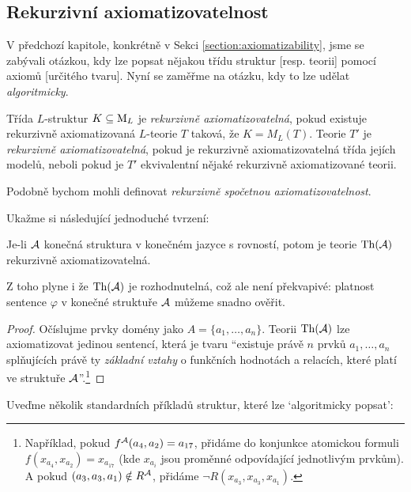  
\subsection{Rekurzivní axiomatizovatelnost}

V předchozí kapitole, konkrétně v Sekci \ref{section:axiomatizability}, jsme se zabývali otázkou, kdy lze popsat nějakou třídu struktur [resp. teorii] pomocí axiomů [určitého tvaru]. Nyní se zaměřme na otázku, kdy to lze udělat \emph{algoritmicky}.

\begin{definition}
Třída $L$-struktur $K\subseteq\operatorname{M}_L$ je \emph{rekurzivně axiomatizovatelná}, pokud existuje rekurzivně axiomatizovaná $L$-teorie $T$ taková, že $K=M_L(T)$. Teorie $T'$ je \emph{rekurzivně axiomatizovatelná}, pokud je rekurzivně axiomatizovatelná třída jejích modelů, neboli pokud je $T'$ ekvivalentní nějaké rekurzivně axiomatizované teorii.
\end{definition}
\begin{remark}
    Podobně bychom mohli definovat \emph{rekurzivně spočetnou axiomatizovatelnost}.
\end{remark}

Ukažme si následující jednoduché tvrzení:

\begin{proposition}
    Je-li $\mathcal{A}$ konečná struktura v konečném jazyce s rovností, potom je teorie $\operatorname{Th}(\mathcal{A})$ rekurzivně axiomatizovatelná.
\end{proposition}
\begin{remark}
    Z toho plyne i že $\operatorname{Th}(\mathcal{A})$ je rozhodnutelná, což ale není překvapivé: platnost sentence $\varphi$ v konečné struktuře $\mathcal{A}$ můžeme snadno ověřit.
\end{remark}
\begin{proof}
    Očíslujme prvky domény jako $A=\{a_1,\dots,a_n\}$. Teorii $\operatorname{Th}(\mathcal{A})$ lze axiomatizovat jedinou sentencí, která je tvaru ``existuje právě $n$ prvků $a_1,\dots,a_n$ splňujících právě ty \emph{základní vztahy} o funkčních hodnotách a relacích, které platí ve struktuře $\mathcal{A}$''.\footnote{Například, pokud $f^{\mathcal{A}}(a_4, a_2)=a_{17}$, přidáme do konjunkce atomickou formuli $f(x_{a_4},x_{a_2})=x_{a_{17}}$ (kde $x_{a_i}$ jsou proměnné odpovídající jednotlivým prvkům). A pokud $(a_3,a_3,a_1)\notin R^{\mathcal{A}}$, přidáme $\neg R(x_{a_3},x_{a_3},x_{a_1})$.}    
\end{proof}
 
Uveďme několik standardních příkladů struktur, které lze `algoritmicky popsat':

